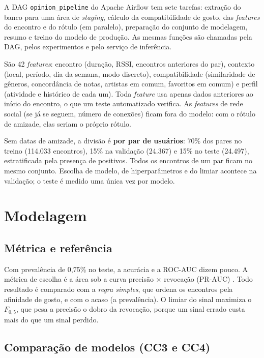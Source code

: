 \documentclass[12pt]{article}
\begin{document}
A DAG \texttt{opinion\_pipeline} do Apache Airflow tem sete tarefas: extração do banco para uma área de
\emph{staging}, cálculo da compatibilidade de gosto, das \emph{features} do encontro e do rótulo (em
paralelo), preparação do conjunto de modelagem, resumo e treino do modelo de produção. As mesmas funções
são chamadas pela DAG, pelos experimentos e pelo serviço de inferência.

São 42 \emph{features}: encontro (duração, RSSI, encontros anteriores do par), contexto (local, período,
dia da semana, modo discreto), compatibilidade (similaridade de gêneros, concordância de notas,
artistas em comum, favoritos em comum) e perfil (atividade e histórico de cada um). Toda \emph{feature}
usa apenas dados anteriores ao início do encontro, o que um teste automatizado verifica. As
\emph{features} de rede social (se já se seguem, número de conexões) ficam fora do modelo: com o rótulo
de amizade, elas seriam o próprio rótulo.

Sem datas de amizade, a divisão é \textbf{por par de usuários}: 70\% dos pares no treino (114.033
encontros), 15\% na validação (24.367) e 15\% no teste (24.497), estratificada pela presença de
positivos. Todos os encontros de um par ficam no mesmo conjunto. Escolha de modelo, de hiperparâmetros
e do limiar acontece na validação; o teste é medido uma única vez por modelo.

\section{Modelagem}

\subsection{Métrica e referência}

Com prevalência de 0,75\% no teste, a acurácia e a ROC-AUC dizem pouco. A métrica de escolha é a área
sob a curva precisão $\times$ revocação (PR-AUC) \cite{saito2015precision}. Todo resultado é comparado
com a \emph{regra simples}, que ordena os encontros pela afinidade de gosto, e com o acaso (a
prevalência). O limiar do sinal maximiza o $F_{0,5}$, que pesa a precisão o dobro da revocação, porque
um sinal errado custa mais do que um sinal perdido.

\subsection{Comparação de modelos (CC3 e CC4)}
\end{document}
